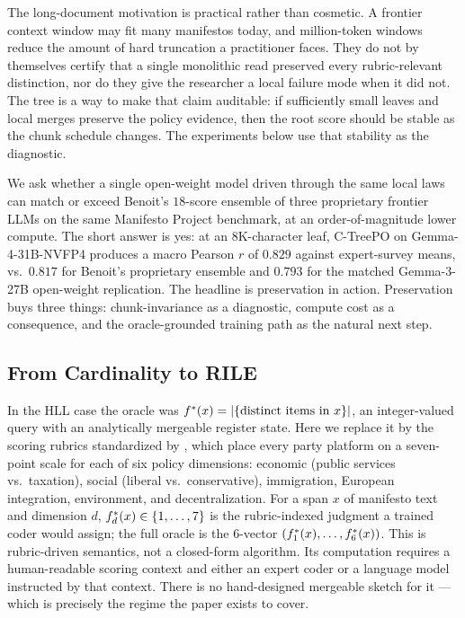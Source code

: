 The long-document motivation is practical rather than cosmetic. A
frontier context window may fit many manifestos today, and million-token
windows reduce the amount of hard truncation a practitioner faces. They do
not by themselves certify that a single monolithic read preserved every
rubric-relevant distinction, nor do they give the researcher a local
failure mode when it did not. The tree is a way to make that claim
auditable: if sufficiently small leaves and local merges preserve the
policy evidence, then the root score should be stable as the chunk
schedule changes. The experiments below use that stability as the
diagnostic.

We ask whether a single open-weight model driven through the same local laws can match or exceed Benoit's $18$-score ensemble of three proprietary frontier LLMs on the same Manifesto Project benchmark, at an order-of-magnitude lower compute. The short answer is yes: at an $8\mathrm{K}$-character leaf, C-TreePO on Gemma-4-31B-NVFP4 produces a macro Pearson $r$ of $0.829$ against expert-survey means, vs.\ $0.817$ for Benoit's proprietary ensemble and $0.793$ for the matched Gemma-3-27B open-weight replication. The headline is preservation in action. Preservation buys three things: chunk-invariance as a diagnostic, compute cost as a consequence, and the oracle-grounded training path as the natural next step.

\subsection{From Cardinality to RILE}

In the HLL case the oracle was
$f^\ast(x) = |\{\text{distinct items in } x\}|$, an integer-valued query
with an analytically mergeable register state. Here we replace it by
the scoring rubrics standardized by \citet{BenoitEtAl2025}, which place
every party platform on a seven-point scale for each of six policy
dimensions: economic (public services vs.\ taxation), social
(liberal vs.\ conservative), immigration, European integration,
environment, and decentralization. For a span $x$ of manifesto text and
dimension $d$, $f^\ast_d(x) \in \{1,\dots,7\}$ is the rubric-indexed
judgment a trained coder would assign; the full oracle is the $6$-vector
$(f^\ast_1(x),\dots,f^\ast_6(x))$. This is rubric-driven semantics, not
a closed-form algorithm. Its computation requires a human-readable
scoring context and either an expert coder or a language model
instructed by that context. There is no hand-designed mergeable sketch
for it --- which is precisely the regime the paper exists to cover.


